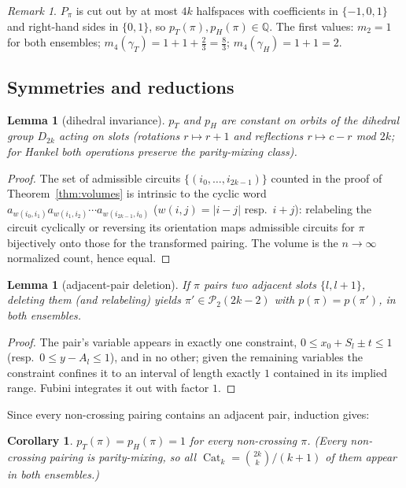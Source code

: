 ﻿\documentclass[11pt]{article}
\newtheorem{lemma}[theorem]{Lemma}
\newtheorem{corollary}[theorem]{Corollary}
\theoremstyle{remark}
\newtheorem{remark}[theorem]{Remark}
\newcommand{\Cat}{\operatorname{Cat}}
\newcommand{\PP}{\mathcal{P}_2}
\newcommand{\gT}{\gamma_T}
\newcommand{\gH}{\gamma_H}
\begin{document}
\begin{remark}
$P_\pi$ is cut out by at most $4k$ halfspaces with coefficients in $\{-1,0,1\}$ and
right-hand sides in $\{0,1\}$, so $p_T(\pi),p_H(\pi)\in\mathbb{Q}$. The first values:
$m_2=1$ for both ensembles; $m_4(\gT)=1+1+\tfrac23=\tfrac83$; $m_4(\gH)=1+1=2$.
\end{remark}

\subsection{Symmetries and reductions}

\begin{lemma}[dihedral invariance]\label{lem:dihedral}
$p_T$ and $p_H$ are constant on orbits of the dihedral group $D_{2k}$ acting on slots
(rotations $r\mapsto r+1$ and reflections $r\mapsto c-r$ mod $2k$; for Hankel both
operations preserve the parity-mixing class).
\end{lemma}
\begin{proof}
The set of admissible circuits $\{(i_0,\dots,i_{2k-1})\}$ counted in the proof of
Theorem~\ref{thm:volumes} is intrinsic to the cyclic word
$a_{w(i_0,i_1)}a_{w(i_1,i_2)}\cdots a_{w(i_{2k-1},i_0)}$ ($w(i,j)=|i-j|$ resp.\ $i+j$):
relabeling the circuit cyclically or reversing its orientation maps admissible circuits
for $\pi$ bijectively onto those for the transformed pairing. The volume is the
$n\to\infty$ normalized count, hence equal.
\end{proof}

\begin{lemma}[adjacent-pair deletion]\label{lem:deletion}
If $\pi$ pairs two adjacent slots $\{l,l+1\}$, deleting them (and relabeling) yields
$\pi'\in\PP(2k-2)$ with $p(\pi)=p(\pi')$, in both ensembles.
\end{lemma}
\begin{proof}
The pair's variable appears in exactly one constraint, $0\le x_0+S_l\pm t\le1$ (resp.\
$0\le y-A_l\le 1$), and in no other; given the remaining variables the constraint
confines it to an interval of length exactly $1$ contained in its implied range.
Fubini integrates it out with factor $1$.
\end{proof}

Since every non-crossing pairing contains an adjacent pair, induction gives:

\begin{corollary}\label{cor:nc1}
$p_T(\pi)=p_H(\pi)=1$ for every non-crossing $\pi$. (Every non-crossing pairing is
parity-mixing, so all $\Cat_k=\binom{2k}{k}/(k+1)$ of them appear in both ensembles.)
\end{corollary}
\end{document}
